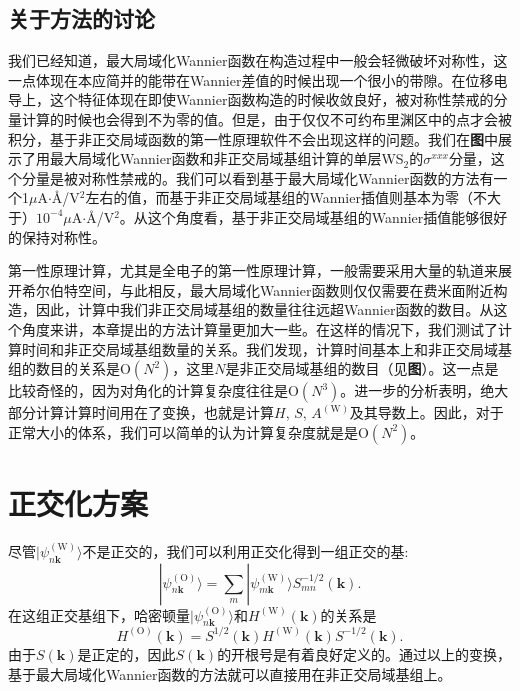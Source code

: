\subsection{关于方法的讨论}

我们已经知道，最大局域化Wannier函数在构造过程中一般会轻微破坏对称性，这一点体现在本应简并的能带在Wannier差值的时候出现一个很小的带隙。在位移电导上，这个特征体现在即使Wannier函数构造的时候收敛良好，被对称性禁戒的分量计算的时候也会得到不为零的值。但是，由于仅仅不可约布里渊区中的点才会被积分，基于非正交局域函数的第一性原理软件不会出现这样的问题。我们在\textbf{图}中展示了用最大局域化Wannier函数和非正交局域基组计算的单层WS$_2$的$\sigma^{xxx}$分量，这个分量是被对称性禁戒的。我们可以看到基于最大局域化Wannier函数的方法有一个1$\mu$A$\cdot$\AA/V$^2$左右的值，而基于非正交局域基组的Wannier插值则基本为零（不大于）$10^{-4}\mu$A$\cdot$\AA/V$^2$。从这个角度看，基于非正交局域基组的Wannier插值能够很好的保持对称性。

第一性原理计算，尤其是全电子的第一性原理计算，一般需要采用大量的轨道来展开希尔伯特空间，与此相反，最大局域化Wannier函数则仅仅需要在费米面附近构造，因此，计算中我们非正交局域基组的数量往往远超Wannier函数的数目。从这个角度来讲，本章提出的方法计算量更加大一些。在这样的情况下，我们测试了计算时间和非正交局域基组数量的关系。我们发现，计算时间基本上和非正交局域基组的数目的关系是$\text{O}(N^2)$，这里$N$是非正交局域基组的数目（见\textbf{图}）。这一点是比较奇怪的，因为对角化的计算复杂度往往是$\text{O}(N^3)$。进一步的分析表明，绝大部分计算计算时间用在了变换，也就是计算$H$, $S$, $A^{(\text{W})}$及其导数上。因此，对于正常大小的体系，我们可以简单的认为计算复杂度就是是$\text{O}(N^2)$。


\section{正交化方案}

尽管$|\psi^{(\text{W})}_{n\boldsymbol{k}}\rangle$不是正交的，我们可以利用正交化得到一组正交的基:
\begin{equation}
|\psi^{(\text{O})}_{n\boldsymbol{k}}\rangle=
\sum_m |\psi^{(\text{W})}_{m\boldsymbol{k}}\rangle S^{-1/2}_{mn}(\boldsymbol{k}).
\end{equation}
在这组正交基组下，哈密顿量$|\psi^{(\text{O})}_{n\boldsymbol{k}}\rangle$和$H^{(\text{W})}(\boldsymbol{k})$的关系是
\begin{equation}
H^{(\text{O})}(\boldsymbol{k})=S^{1/2}(\boldsymbol{k})H^{(\text{W})}(\boldsymbol{k})S^{-1/2}(\boldsymbol{k}).\label{HO-HW}
\end{equation}
由于$S(\boldsymbol{k})$是正定的，因此$S(\boldsymbol{k})$的开根号是有着良好定义的。通过以上的变换，基于最大局域化Wannier函数的方法就可以直接用在非正交局域基组上。

